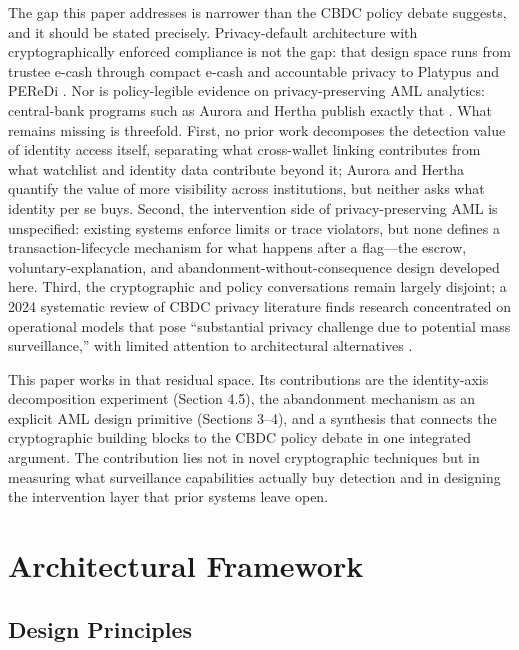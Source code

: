 \documentclass[11pt]{article}
\begin{document}
The gap this paper addresses is narrower than the CBDC policy debate suggests, and it should be stated precisely. Privacy-default architecture with cryptographically enforced compliance is not the gap: that design space runs from trustee e-cash through compact e-cash and accountable privacy to Platypus and PEReDi \citep{CamenischMaurerStadler1996,Camenisch2005CompactEcash,Garman2016Accountable,Wuest2022Platypus,Kiayias2022PEReDi}. Nor is policy-legible evidence on privacy-preserving AML analytics: central-bank programs such as Aurora and Hertha publish exactly that \citep{BISAurora2023,BISHertha2025}. What remains missing is threefold. First, no prior work decomposes the detection value of identity access itself, separating what cross-wallet linking contributes from what watchlist and identity data contribute beyond it; Aurora and Hertha quantify the value of more visibility across institutions, but neither asks what identity per se buys. Second, the intervention side of privacy-preserving AML is unspecified: existing systems enforce limits or trace violators, but none defines a transaction-lifecycle mechanism for what happens after a flag---the escrow, voluntary-explanation, and abandonment-without-consequence design developed here. Third, the cryptographic and policy conversations remain largely disjoint; a 2024 systematic review of CBDC privacy literature finds research concentrated on operational models that pose ``substantial privacy challenge due to potential mass surveillance,'' with limited attention to architectural alternatives \citep{CBDCPrivacyReview2024}.

This paper works in that residual space. Its contributions are the identity-axis decomposition experiment (Section 4.5), the abandonment mechanism as an explicit AML design primitive (Sections 3--4), and a synthesis that connects the cryptographic building blocks to the CBDC policy debate in one integrated argument. The contribution lies not in novel cryptographic techniques but in measuring what surveillance capabilities actually buy detection and in designing the intervention layer that prior systems leave open.


\section{Architectural Framework}

\subsection{Design Principles}
\end{document}
